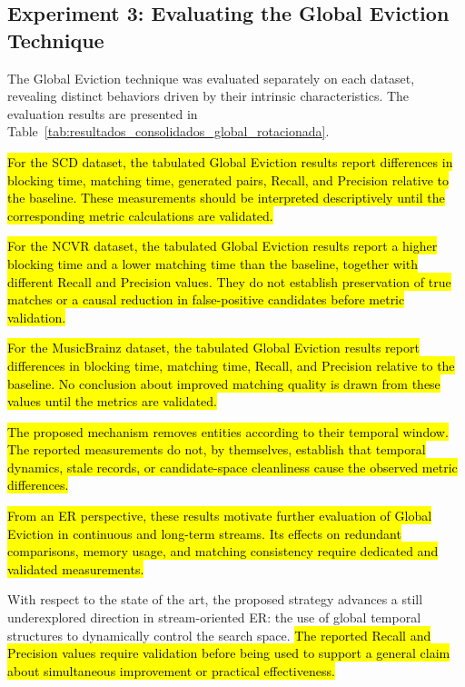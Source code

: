 \documentclass{ieeeaccess}
\begin{document}
\subsection{Experiment 3: Evaluating the Global Eviction Technique}
The Global Eviction technique was evaluated separately on each dataset, revealing distinct behaviors driven by their intrinsic characteristics. The evaluation results are presented in Table~\ref{tab:resultados_consolidados_global_rotacionada}.

\hl{For the SCD dataset, the tabulated Global Eviction results report differences in blocking time, matching time, generated pairs, Recall, and Precision relative to the baseline. These measurements should be interpreted descriptively until the corresponding metric calculations are validated.}

\hl{For the NCVR dataset, the tabulated Global Eviction results report a higher blocking time and a lower matching time than the baseline, together with different Recall and Precision values. They do not establish preservation of true matches or a causal reduction in false-positive candidates before metric validation.}

\hl{For the MusicBrainz dataset, the tabulated Global Eviction results report differences in blocking time, matching time, Recall, and Precision relative to the baseline. No conclusion about improved matching quality is drawn from these values until the metrics are validated.}

\hl{The proposed mechanism removes entities according to their temporal window. The reported measurements do not, by themselves, establish that temporal dynamics, stale records, or candidate-space cleanliness cause the observed metric differences.}

\hl{From an ER perspective, these results motivate further evaluation of Global Eviction in continuous and long-term streams. Its effects on redundant comparisons, memory usage, and matching consistency require dedicated and validated measurements.}

With respect to the state of the art, the proposed strategy advances a still underexplored direction in stream-oriented ER: the use of global temporal structures to dynamically control the search space. \hl{The reported Recall and Precision values require validation before being used to support a general claim about simultaneous improvement or practical effectiveness.}
\end{document}

